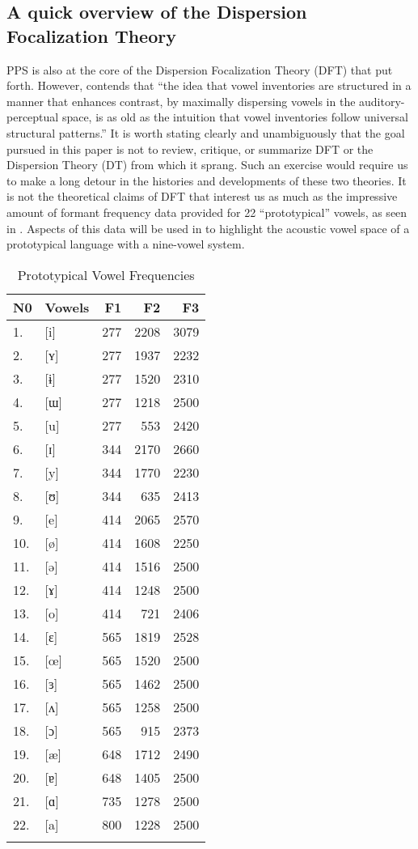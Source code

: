 \documentclass[output=paper,
modfonts
]{langscibook}
\begin{document}
\subsection {A quick overview of the Dispersion Focalization Theory}  
\largerpage
PPS is also at the core of the Dispersion Focalization Theory (DFT) that \citet{SchwartzEtAl1997dispersion} put forth. However, \citet[10]{Becker-Kristal2010} contends that “the idea that vowel inventories are structured in a manner that enhances contrast, by maximally dispersing vowels in the auditory-perceptual space, is as old as the intuition that vowel inventories follow universal structural patterns.” It is worth stating clearly and unambiguously that the goal pursued in this paper is not to review, critique, or summarize DFT or the Dispersion Theory (DT) from which it sprang. Such an exercise would require us to make a long detour in the histories and developments of these two theories. It is not the theoretical claims of DFT that interest us as much as the impressive amount of formant frequency data provided for 22 “prototypical” vowels, as seen in . Aspects of this data will be used in  to highlight the acoustic vowel space of a prototypical language with a nine-vowel system. 

\begin{table}
\caption{Prototypical Vowel Frequencies}
\label{tab:koffi:2}
\begin{tabularx}{.66\textwidth}{XXrrr}
\lsptoprule
N0 & Vowels & F1 & F2 & F3\\
\midrule
1. & [i] & 277 & 2208 & 3079\\
2. & [ʏ] & 277 & 1937 & 2232\\
3. & [ɨ] & 277 & 1520 & 2310\\
4. & [ɯ] & 277 & 1218 & 2500\\
5. & [u] & 277 & 553 & 2420\\
6. & [ɪ] & 344 & 2170 & 2660\\
7. & [y] & 344 & 1770 & 2230\\
8. & [ʊ] & 344 & 635 & 2413\\
9. & [e] & 414 & 2065 & 2570\\
10. & [ø] & 414 & 1608 & 2250\\
11. & [ə] & 414 & 1516 & 2500\\
12. & [ɤ] & 414 & 1248 & 2500\\
13. & [o] & 414 & 721 & 2406\\
14. & [ɛ] & 565 & 1819 & 2528\\
15. & [œ] & 565 & 1520 & 2500\\
16. & [ɜ] & 565 & 1462 & 2500\\
17. & [ʌ] & 565 & 1258 & 2500\\
18. & [ɔ] & 565 & 915 & 2373\\
19. & [æ] & 648 & 1712 & 2490\\
20. & [ɐ] & 648 & 1405 & 2500\\
21. & [ɑ] & 735 & 1278 & 2500\\
22. & [a] & 800 & 1228 & 2500\\
\lspbottomrule
\end{tabularx}
\end{table}
\end{document}
